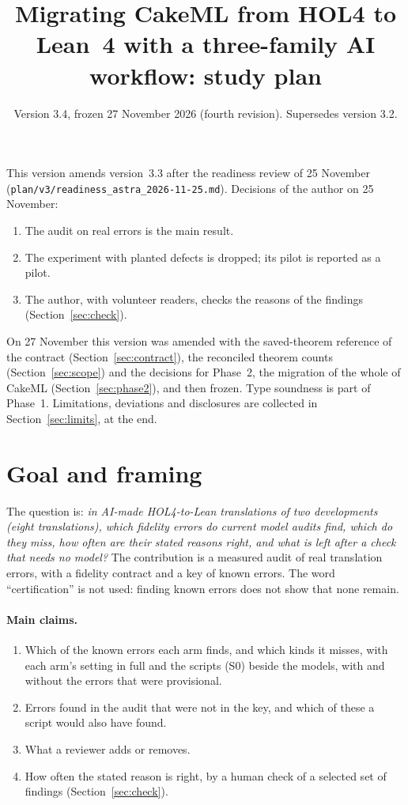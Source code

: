 \documentclass[11pt,a4paper]{article}
\title{Migrating CakeML from HOL4 to Lean~4 with a three-family AI workflow: study plan}
\author{Version 3.4, frozen 27 November 2026 (fourth revision). Supersedes version 3.2.}
\date{}
\newcommand{\code}[1]{\texttt{#1}}
\begin{document}
\sloppy
\maketitle

\noindent This version amends version~3.3 after the readiness review of 25 November (\code{plan/v3/readiness\_astra\_2026-11-25.md}). Decisions of the author on 25 November:
\begin{enumerate}
\item The audit on real errors is the main result.
\item The experiment with planted defects is dropped; its pilot is reported as a pilot.
\item The author, with volunteer readers, checks the reasons of the findings (Section~\ref{sec:check}).
\end{enumerate}
On 27 November this version was amended with the saved-theorem reference of the contract (Section~\ref{sec:contract}), the reconciled theorem counts (Section~\ref{sec:scope}) and the decisions for Phase~2, the migration of the whole of CakeML (Section~\ref{sec:phase2}), and then frozen. Type soundness is part of Phase~1. Limitations, deviations and disclosures are collected in Section~\ref{sec:limits}, at the end.

\section{Goal and framing}\label{sec:goal}
The question is: \emph{in AI-made HOL4-to-Lean translations of two developments (eight translations), which fidelity errors do current model audits find, which do they miss, how often are their stated reasons right, and what is left after a check that needs no model?} The contribution is a measured audit of real translation errors, with a fidelity contract and a key of known errors. The word ``certification'' is not used: finding known errors does not show that none remain.

\paragraph{Main claims.}
\begin{enumerate}
\item Which of the known errors each arm finds, and which kinds it misses, with each arm's setting in full and the scripts (S0) beside the models, with and without the errors that were provisional.
\item Errors found in the audit that were not in the key, and which of these a script would also have found.
\item What a reviewer adds or removes.
\item How often the stated reason is right, by a human check of a selected set of findings (Section~\ref{sec:check}).
\end{enumerate}
\end{document}
